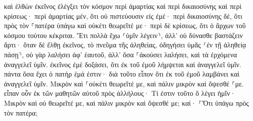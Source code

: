 \documentclass{openreader}
\begin{document}
καὶ ἐλθὼν ἐκεῖνος ἐλέγξει τὸν κόσμον περὶ ἁμαρτίας καὶ περὶ δικαιοσύνης καὶ περὶ κρίσεως· 
περὶ ἁμαρτίας μέν, ὅτι οὐ πιστεύουσιν εἰς ἐμέ· 
περὶ δικαιοσύνης δέ, ὅτι πρὸς τὸν ⸀πατέρα ὑπάγω καὶ οὐκέτι θεωρεῖτέ με· 
περὶ δὲ κρίσεως, ὅτι ὁ ἄρχων τοῦ κόσμου τούτου κέκριται. 
Ἔτι πολλὰ ἔχω ⸂ὑμῖν λέγειν⸃, ἀλλ’ οὐ δύνασθε βαστάζειν ἄρτι· 
ὅταν δὲ ἔλθῃ ἐκεῖνος, τὸ πνεῦμα τῆς ἀληθείας, ὁδηγήσει ὑμᾶς ⸂ἐν τῇ ἀληθείᾳ πάσῃ⸃, οὐ γὰρ λαλήσει ἀφ’ ἑαυτοῦ, ἀλλ’ ὅσα ⸀ἀκούσει λαλήσει, καὶ τὰ ἐρχόμενα ἀναγγελεῖ ὑμῖν. 
ἐκεῖνος ἐμὲ δοξάσει, ὅτι ἐκ τοῦ ἐμοῦ λήμψεται καὶ ἀναγγελεῖ ὑμῖν. 
πάντα ὅσα ἔχει ὁ πατὴρ ἐμά ἐστιν· διὰ τοῦτο εἶπον ὅτι ἐκ τοῦ ἐμοῦ λαμβάνει καὶ ἀναγγελεῖ ὑμῖν. 
Μικρὸν καὶ ⸀οὐκέτι θεωρεῖτέ με, καὶ πάλιν μικρὸν καὶ ὄψεσθέ ⸀με. 
εἶπαν οὖν ἐκ τῶν μαθητῶν αὐτοῦ πρὸς ἀλλήλους· Τί ἐστιν τοῦτο ὃ λέγει ἡμῖν· Μικρὸν καὶ οὐ θεωρεῖτέ με, καὶ πάλιν μικρὸν καὶ ὄψεσθέ με; καί· ⸀Ὅτι ὑπάγω πρὸς τὸν πατέρα; 
\end{document}
